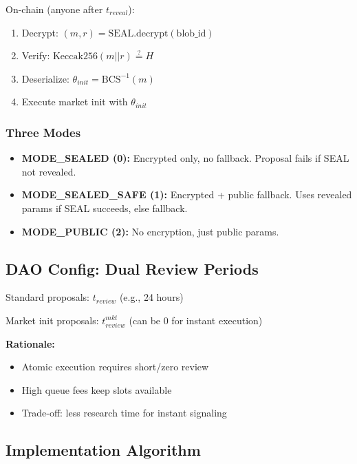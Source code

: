 \documentclass{article}
\begin{document}
On-chain (anyone after $t_{reveal}$):
\begin{enumerate}
\item Decrypt: $(m, r) = \text{SEAL.decrypt}(\text{blob\_id})$
\item Verify: $\text{Keccak256}(m || r) \stackrel{?}{=} H$
\item Deserialize: $\theta_{init} = \text{BCS}^{-1}(m)$
\item Execute market init with $\theta_{init}$
\end{enumerate}

\subsubsection{Three Modes}

\begin{itemize}
\item \textbf{MODE\_SEALED (0):} Encrypted only, no fallback. Proposal fails if SEAL not revealed.
\item \textbf{MODE\_SEALED\_SAFE (1):} Encrypted + public fallback. Uses revealed params if SEAL succeeds, else fallback.
\item \textbf{MODE\_PUBLIC (2):} No encryption, just public params.
\end{itemize}

\subsection{DAO Config: Dual Review Periods}

Standard proposals: $t_{review}$ (e.g., 24 hours)

Market init proposals: $t_{review}^{mkt}$ (can be 0 for instant execution)

\textbf{Rationale:}
\begin{itemize}
\item Atomic execution requires short/zero review
\item High queue fees keep slots available
\item Trade-off: less research time for instant signaling
\end{itemize}

\subsection{Implementation Algorithm}
\end{document}

